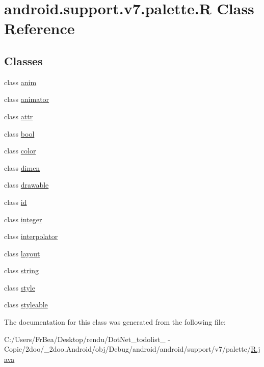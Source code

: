 \hypertarget{classandroid_1_1support_1_1v7_1_1palette_1_1_r}{
\section{android.support.v7.palette.R Class Reference}
\label{classandroid_1_1support_1_1v7_1_1palette_1_1_r}
}
\subsection*{Classes}
\begin{CompactItemize}
\item 
class \hyperlink{classandroid_1_1support_1_1v7_1_1palette_1_1_r_1_1anim}{anim}
\item 
class \hyperlink{classandroid_1_1support_1_1v7_1_1palette_1_1_r_1_1animator}{animator}
\item 
class \hyperlink{classandroid_1_1support_1_1v7_1_1palette_1_1_r_1_1attr}{attr}
\item 
class \hyperlink{classandroid_1_1support_1_1v7_1_1palette_1_1_r_1_1bool}{bool}
\item 
class \hyperlink{classandroid_1_1support_1_1v7_1_1palette_1_1_r_1_1color}{color}
\item 
class \hyperlink{classandroid_1_1support_1_1v7_1_1palette_1_1_r_1_1dimen}{dimen}
\item 
class \hyperlink{classandroid_1_1support_1_1v7_1_1palette_1_1_r_1_1drawable}{drawable}
\item 
class \hyperlink{classandroid_1_1support_1_1v7_1_1palette_1_1_r_1_1id}{id}
\item 
class \hyperlink{classandroid_1_1support_1_1v7_1_1palette_1_1_r_1_1integer}{integer}
\item 
class \hyperlink{classandroid_1_1support_1_1v7_1_1palette_1_1_r_1_1interpolator}{interpolator}
\item 
class \hyperlink{classandroid_1_1support_1_1v7_1_1palette_1_1_r_1_1layout}{layout}
\item 
class \hyperlink{classandroid_1_1support_1_1v7_1_1palette_1_1_r_1_1string}{string}
\item 
class \hyperlink{classandroid_1_1support_1_1v7_1_1palette_1_1_r_1_1style}{style}
\item 
class \hyperlink{classandroid_1_1support_1_1v7_1_1palette_1_1_r_1_1styleable}{styleable}
\end{CompactItemize}


The documentation for this class was generated from the following file:\begin{CompactItemize}
\item 
C:/Users/FrBea/Desktop/rendu/DotNet\_\-todolist\_ - Copie/2doo/\_\-2doo.Android/obj/Debug/android/android/support/v7/palette/\hyperlink{android_2support_2v7_2palette_2_r_8java}{R.java}\end{CompactItemize}
